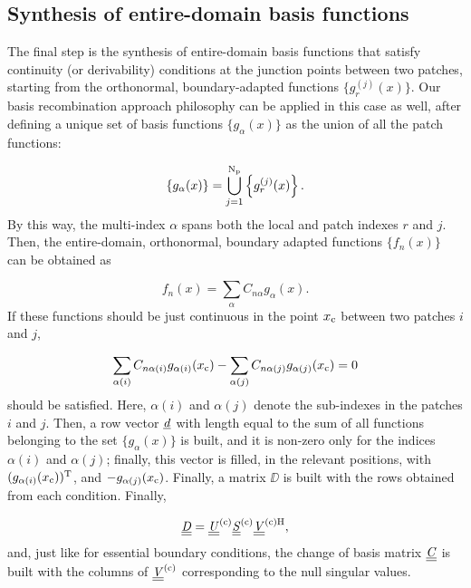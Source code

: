 \documentclass[a4paper,12pt]{article}
\begin{document}
\subsection{Synthesis of entire-domain basis functions}

The final step is the synthesis of entire-domain basis functions that satisfy continuity (or derivability) conditions at the junction points between two patches, starting from the orthonormal, boundary-adapted functions $\{g_r^{(j)}(x)\}$. Our basis recombination approach philosophy can be applied in this case as well, after defining a unique set of basis functions $\{g_\alpha(x)\}$ as the union of all the patch functions:

\[
\left\{ g_\alpha(x) \right\} = \bigcup_{j=1}^{\mathrm{N_{\mathrm{p}}}} \left\{ g_r^{(j)}(x) \right\}.
\]
By this way, the multi-index $\alpha$ spans both the local and patch indexes $r$ and $j$. Then, the entire-domain, orthonormal, boundary adapted functions $\{f_n(x)\}$ can be obtained as

\[
f_n(x) = \sum_{\alpha} C_{n\alpha} g_\alpha(x).
\]
If these functions should be just continuous in the point $x_{\mathrm{c}}$ between two patches $i$ and $j$, 

\[
\sum_{\alpha(i)} C_{n\alpha(i)} g_{\alpha(i)}(x_{\mathrm{c}}) - \sum_{\alpha(j)} C_{n\alpha(j)} g_{\alpha(j)}(x_{\mathrm{c}}) = 0
\]
should be satisfied. Here, $\alpha(i)$ and $\alpha(j)$ denote the sub-indexes in the patches $i$ and $j$. Then, a row vector $\underline{\mathit{d}}$ with length equal to the sum of all functions belonging to the set $\{g_\alpha(x)\}$ is built, and it is non-zero only for the indices $\alpha(i)$ and $\alpha(j)$; finally, this vector is filled, in the relevant positions, with $(g_{\alpha(i)}(x_{\mathrm{c}}))^{\mathrm{T}}$, and $-g_{\alpha(j)}(x_{\mathrm{c}})$. Finally, a matrix $\DD$ is built with the rows obtained from each condition. Finally,

\[
\underline{\underline{\mathit{D}}} = \underline{\underline{\mathit{U}}}^{\mathrm{(c)}} \underline{\underline{\mathit{S}}}^{\mathrm{(c)}} \underline{\underline{\mathit{V}}}^{\mathrm{(c)H}},
\]
and, just like for essential boundary conditions, the change of basis matrix $\underline{\underline{\mathit{C}}}$ is built with the columns of $\underline{\underline{\mathit{V}}}^{\mathrm{(c)}}$ corresponding to the null singular values.








\end{document}
